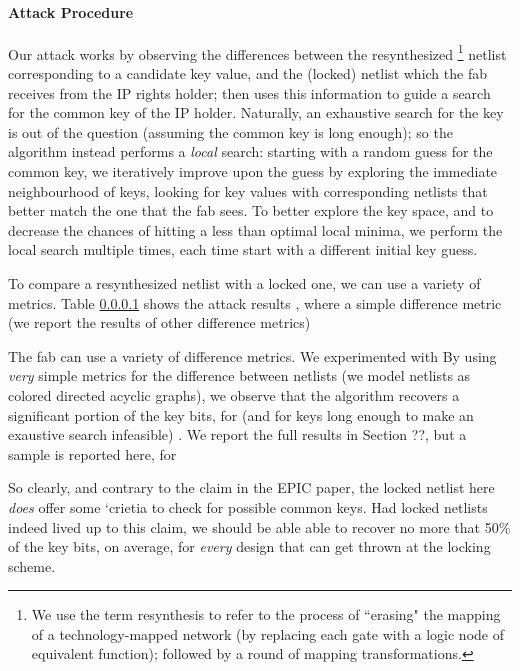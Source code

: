 \paragraph{Attack Procedure} Our attack works by observing the differences between the resynthesized \footnote{We use the term resynthesis to refer to the process of ``erasing" the mapping of a technology-mapped network (by replacing each gate with a logic node of equivalent function); followed by a round of mapping transformations.} netlist corresponding to a candidate key value, and the (locked) netlist which the fab receives from the IP rights holder; then uses this information to guide a search for the  common key of the IP holder. Naturally, an exhaustive search for the key is out of the question (assuming the common key is long enough); so the algorithm instead performs a \emph{local} search: starting with a random guess for the common key, we iteratively improve upon the guess by exploring the immediate neighbourhood of keys, looking for key values with corresponding netlists that better match the one that the fab sees. To better explore the key space, and to decrease the chances of hitting a less than optimal local minima, we perform the local search multiple times, each time start with a different initial key guess. 

To compare a resynthesized netlist with a locked one, we can use a variety of metrics.
Table \ref{} shows the attack results , where a simple difference metric (we report the results of other difference metrics)


The fab can use a variety of difference metrics. We experimented with  By using \emph{very} simple metrics for the difference between netlists (we model netlists as colored directed acyclic graphs), we observe that the algorithm recovers a significant portion of the key bits, for (and for keys long enough to make an exaustive search infeasible) . We report the full results in Section ??, but a sample is reported here, for  


So clearly, and contrary to the claim in the EPIC paper, the locked netlist here \emph{does} offer some `crietia to check for possible common keys. Had locked netlists indeed lived up to this claim, we should be able able to recover no more that 50\% of the key bits, on average, for \emph{every} design that can get thrown at the locking scheme.

